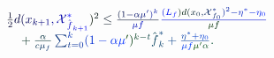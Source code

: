 \documentclass[12pt]{article}
\begin{document}
\makeatletter
\renewcommand*{\@textcolor}[3]{%
  \protect\leavevmode
  \begingroup
    \color#1{#2}#3%
  \endgroup
}
\makeatother
\begin{displaymath}
\begin{array} {rl} & { { } \mathcolor[RGB]{0,0,15}{\frac { \mathcolor[RGB]{0,0,30}{1} } { \mathcolor[RGB]{0,0,45}{2} } } \mathcolor[RGB]{0,0,60}{d} \mathcolor[RGB]{0,0,75}{(} \mathcolor[RGB]{0,0,90}{x} _ { \mathcolor[RGB]{0,0,105}{k} \mathcolor[RGB]{0,0,120}{+} \mathcolor[RGB]{0,0,135}{1} } \mathcolor[RGB]{0,0,150}{,} \mathcal { \mathcolor[RGB]{0,0,165}{X} } _ { {\mathcolor[RGB]{0,0,180}{\hat { \mathcolor[RGB]{0,0,195}{f} } }} _ { \mathcolor[RGB]{0,0,210}{k} \mathcolor[RGB]{0,0,225}{+} \mathcolor[RGB]{0,0,240}{1} } } ^ { \mathcolor[RGB]{0,0,255}{*} } \mathcolor[RGB]{0,15,0}{)} ^ { \mathcolor[RGB]{0,15,15}{2} } \mathcolor[RGB]{0,15,30}{\leq} \mathcolor[RGB]{0,15,45}{\frac { \mathcolor[RGB]{0,15,60}{(} \mathcolor[RGB]{0,15,75}{1} \mathcolor[RGB]{0,15,90}{-} \mathcolor[RGB]{0,15,105}{\alpha} \mathcolor[RGB]{0,15,120}{\mu} ^ { \mathcolor[RGB]{0,15,135}{\prime} } \mathcolor[RGB]{0,15,150}{)} ^ { \mathcolor[RGB]{0,15,165}{k} } } { \mathcolor[RGB]{0,15,180}{\mu} \mathcolor[RGB]{0,15,195}{f} } } \mathcolor[RGB]{0,15,210}{\frac { \mathcolor[RGB]{0,15,225}{\left(} \mathcolor[RGB]{0,15,240}{L} _ { \mathcolor[RGB]{0,15,255}{f} } \mathcolor[RGB]{0,30,0}{\right)} \mathcolor[RGB]{0,30,15}{d} \mathcolor[RGB]{0,30,30}{(} \mathcolor[RGB]{0,30,45}{x} _ { \mathcolor[RGB]{0,30,60}{0} } \mathcolor[RGB]{0,30,75}{,} \mathcal { \mathcolor[RGB]{0,30,90}{X} } _ { \mathcolor[RGB]{0,30,105}{f} _ { \mathcolor[RGB]{0,30,120}{0} } } ^ { \mathcolor[RGB]{0,30,135}{*} } \mathcolor[RGB]{0,30,150}{)} ^ { \mathcolor[RGB]{0,30,165}{2} } \mathcolor[RGB]{0,30,180}{-} \mathcolor[RGB]{0,30,195}{\eta} ^ { \mathcolor[RGB]{0,30,210}{*} } \mathcolor[RGB]{0,30,225}{-} \mathcolor[RGB]{0,30,240}{\eta} _ { \mathcolor[RGB]{0,30,255}{0} } } { \mathcolor[RGB]{0,45,0}{\mu} \mathcolor[RGB]{0,45,15}{f} } } } \\ & { { } \quad \mathcolor[RGB]{0,45,30}{+} \mathcolor[RGB]{0,45,45}{\frac { \mathcolor[RGB]{0,45,60}{\alpha} } { \mathcolor[RGB]{0,45,75}{c} \mathcolor[RGB]{0,45,90}{\mu} _ { \mathcolor[RGB]{0,45,105}{f} } } } \mathcolor[RGB]{0,45,120}{\sum} _ { \mathcolor[RGB]{0,45,135}{t} \mathcolor[RGB]{0,45,150}{=} \mathcolor[RGB]{0,45,165}{0} } ^ { \mathcolor[RGB]{0,45,180}{k} } \mathcolor[RGB]{0,45,195}{(} \mathcolor[RGB]{0,45,210}{1} \mathcolor[RGB]{0,45,225}{-} \mathcolor[RGB]{0,45,240}{\alpha} \mathcolor[RGB]{0,45,255}{\mu} ^ { \mathcolor[RGB]{0,60,0}{\prime} } \mathcolor[RGB]{0,60,15}{)} ^ { \mathcolor[RGB]{0,60,30}{k} \mathcolor[RGB]{0,60,45}{-} \mathcolor[RGB]{0,60,60}{t} } {\mathcolor[RGB]{0,60,75}{\hat { \mathcolor[RGB]{0,60,90}{f} } }} _ { \mathcolor[RGB]{0,60,105}{k} } ^ { \mathcolor[RGB]{0,60,120}{*} } \mathcolor[RGB]{0,60,135}{+} \mathcolor[RGB]{0,60,150}{\frac { \mathcolor[RGB]{0,60,165}{\eta} ^ { \mathcolor[RGB]{0,60,180}{*} } \mathcolor[RGB]{0,60,195}{+} \mathcolor[RGB]{0,60,210}{\eta} _ { \mathcolor[RGB]{0,60,225}{0} } } { \mathcolor[RGB]{0,60,240}{\mu} \mathcolor[RGB]{0,60,255}{f} \mathcolor[RGB]{0,75,0}{\mu} ^ { \mathcolor[RGB]{0,75,15}{\prime} } \mathcolor[RGB]{0,75,30}{\alpha} } } \mathcolor[RGB]{0,75,45}{.} } \end{array}
\end{displaymath}
\end{document}
